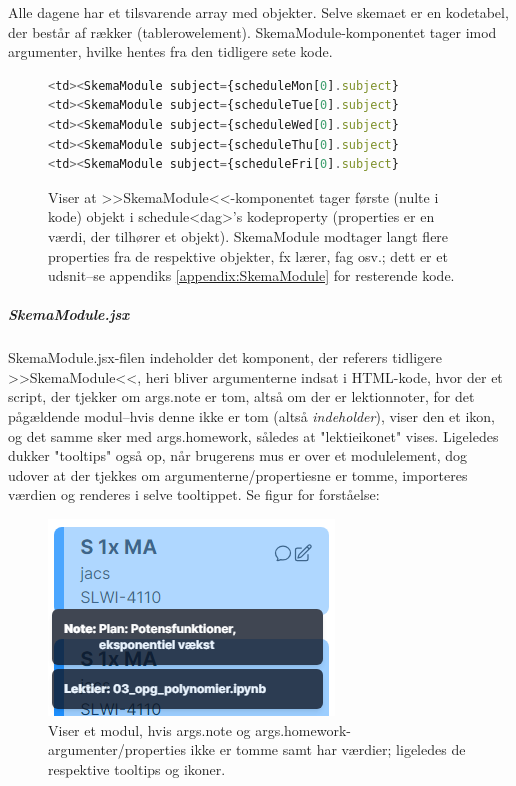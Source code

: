         Alle dagene har et tilsvarende array med objekter. Selve skemaet er en kodetabel, der består af rækker (tablerowelement). SkemaModule-komponentet tager imod argumenter, hvilke hentes fra den tidligere sete kode. 
        \begin{figure}[H]
        \begin{lstlisting}[language=Javascript]
<td><SkemaModule subject={scheduleMon[0].subject}
<td><SkemaModule subject={scheduleTue[0].subject}
<td><SkemaModule subject={scheduleWed[0].subject}
<td><SkemaModule subject={scheduleThu[0].subject}
<td><SkemaModule subject={scheduleFri[0].subject}
        \end{lstlisting}
        \caption{Viser at >>SkemaModule<<-komponentet tager første (nulte i kode) objekt i schedule<dag>'s kodeproperty (properties er en værdi, der tilhører et objekt). SkemaModule modtager langt flere properties fra de respektive objekter, fx lærer, fag osv.; dett er et udsnit--se appendiks \ref{appendix:SkemaModule} for resterende kode.}
        \end{figure}
       
        \subparagraph{SkemaModule.jsx}
        SkemaModule.jsx-filen indeholder det komponent, der referers tidligere >>SkemaModule<<, heri bliver argumenterne indsat i HTML-kode, hvor der et script, der tjekker om args.note er tom, altså om der er lektionnoter, for det pågældende modul--hvis denne ikke er tom (altså \textit{indeholder}), viser den et ikon, og det samme sker med args.homework, således at "lektieikonet" vises. Ligeledes dukker "tooltips" også op, når brugerens mus er over et modulelement, dog udover at der tjekkes om argumenterne/propertiesne er tomme, importeres værdien og renderes i selve tooltippet. Se figur for forståelse:

        \begin{figure}[H]
        \centering
        \includegraphics{assets/moduleElement2.png}
        \caption{Viser et modul, hvis args.note og args.homework-argumenter/properties ikke er tomme samt har værdier; ligeledes de respektive tooltips og ikoner.}
        \end{figure}
        
